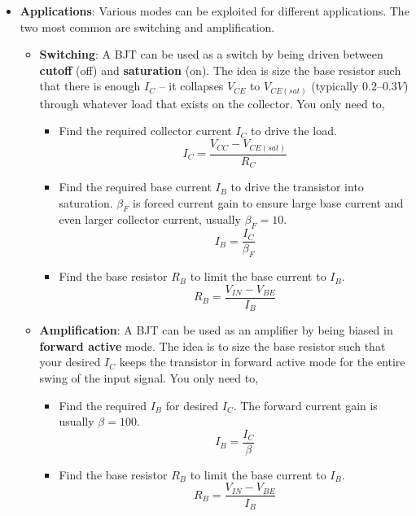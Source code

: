 \begin{itemize}
\begin{table}[H]
\begin{tabular}{|c|c|c|c|}
      \end{tabular}
    \end{table}
  \item \textbf{Applications}:
    Various modes can be exploited for different applications. The two
    most common are switching and amplification.
    \begin{itemize}
      \item \textbf{Switching}:
        A BJT can be used as a switch by being driven between \textbf{cutoff}
        (off) and \textbf{saturation} (on). The idea is size the base resistor
        such that there is enough \(I_C\) -- it collapses  \(V_{CE}\) to
        \(V_{CE(sat)}\) (typically \(0.2\text{--}0.3 V\)) through whatever load
        that exists on the collector. You only need to,
        \begin {itemize}
          \item Find the required collector current \(I_C\) to drive the load.
            \[
              I_C = \frac{V_{CC} - V_{CE(sat)}}{R_C}
            \]
          \item Find the required base current \(I_B\) to drive the transistor into
            saturation. \(\beta_F\) is forced current gain to ensure large base current
            and even larger collector current, usually \(\beta_F = 10\).
            \[
              I_B = \frac{I_C}{\beta_{F}}
            \]
          \item Find the base resistor \(R_B\) to limit the base current to \(I_B\).
            \[
              R_B = \frac{V_{IN} - V_{BE}}{I_B}
            \]
        \end{itemize}
      \item \textbf{Amplification}:
        A BJT can be used as an amplifier by being biased in \textbf{forward
        active} mode. The idea is to size the base resistor such that your
        desired \(I_C\) keeps the transistor in forward active mode for the
        entire swing of the input signal. You only need to,
        \begin{itemize}
          \item Find the required \(I_B\) for desired \(I_C\). The forward
            current gain is usually \(\beta = 100\).
            \[
              I_B = \frac{I_C}{\beta}
            \]
          \item Find the base resistor \(R_B\) to limit the base current
            to \(I_B\).
            \[
              R_B = \frac{V_{IN} - V_{BE}}{I_B}
            \]
        \end{itemize}

\end{itemize}
\end{itemize}
